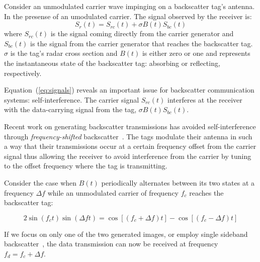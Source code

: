 Consider an unmodulated carrier wave impinging on a backscatter tag's
antenna. In the presense of an umodulated carrier. The signal observed
by the receiver is: \begin{equation}
				S_r(t) = S_{rc}(t) + \sigma B(t)S_{bc}(t)
				\label{eq:signals}
\end{equation}
where $S_{rc}(t)$ is the signal coming directly from the carrier
generator and $S_{bc}(t)$ is the signal from the carrier generator that
reaches the backscatter tag. $\sigma$ is the tag's radar cross section
and $B(t)$ is either zero or one and represents the instantaneous state
of the backscatter tag: absorbing or reflecting, respectively.

Equation~(\ref{eq:signals}) reveals an important issue for backscatter
communication systems: self-interference. The carrier signal $S_{rc}(t)$
interferes at the receiver with the data-carrying signal from the tag,
$\sigma B(t)S_{bc}(t)$. 

Recent work on generating backscatter transmissions has avoided
self-interference through \textit{frequency-shifted}
backscatter~\cite{kellogg_passive_2016,wang_fm_2017,varshney2016lorea,
iyer2016inter}.
The tags modulate their antenna in such a way that their transmissions
occur at a certain frequency offset from the carrier signal thus
allowing the receiver to avoid interference from the carrier by tuning
to the offset frequency where the tag is transmitting.

Consider the case when $B(t)$ periodically
alternates between its two states at a frequency $\Delta f$ while an
unmodulated carrier of frequency $f_c$ reaches the backscatter tag:

\begin{equation}
    2\sin(f_c t) \sin(\Delta f t) = \cos[(f_c + \Delta f)t] - \cos[(f_c - \Delta f) t]
    \label{eq:mixing}
\end{equation}

If we focus on only one of the two generated images, or employ single
sideband backscatter~\cite{iyer2016inter}, the data transmission can now
be received at frequency $f_d = f_c + \Delta f$.

